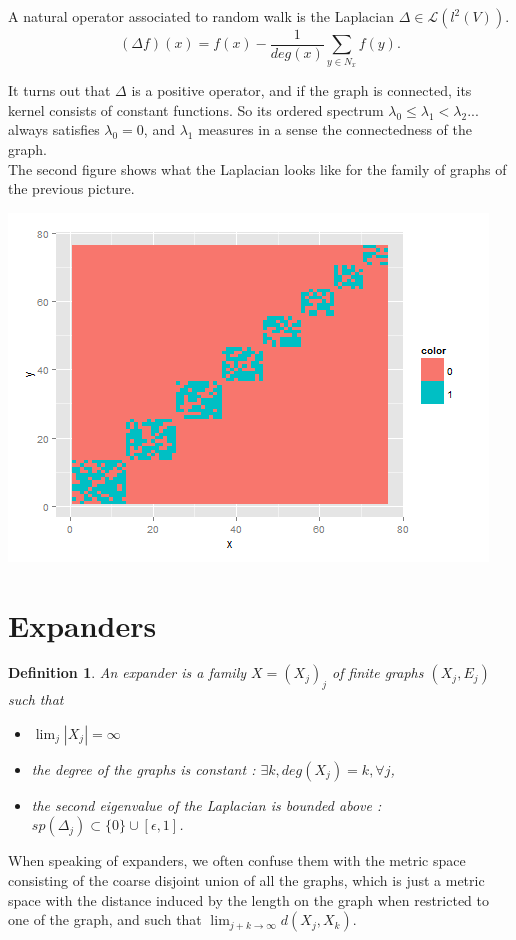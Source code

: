 \documentclass[a0,portrait]{a0poster}
\newtheorem{definition}{Definition}
\begin{document}
\begin{multicols}{2}
A natural operator associated to random walk is the Laplacian $\Delta \in \mathcal L(l^2(V))$.
\[(\Delta f) (x) = f(x) - \frac{1}{deg(x)}\sum_{y\in N_x} f(y) .\] 

It turns out that $\Delta$ is a positive operator, and if the graph is connected, its kernel consists of constant functions. So its ordered spectrum $\lambda_0\leq \lambda_1<\lambda_2...$ always satisfies $\lambda_0=0$, and $\lambda_1$ measures in a sense the connectedness of the graph.\\

The second figure shows what the Laplacian looks like for the family of graphs of the previous picture.\\

\begin{center}\vspace{1cm}
\includegraphics[width=0.9\linewidth]{Laplacian}
\end{center}\vspace{1cm}

\section*{Expanders}

\begin{definition}
An expander is a family $X=(X_j)_j$ of finite graphs $(X_j,E_j)$ such that 
\begin{itemize}
\item[$\bullet$] $\lim_{j}|X_j|=\infty$
\item[$\bullet$] the degree of the graphs is constant : $\exists k, deg(X_j)=k,\forall j$,
\item[$\bullet$] the second eigenvalue of the Laplacian is bounded above : $sp(\Delta_j)\subset \{0\}\cup [\epsilon,1]$.
\end{itemize}
\end{definition}
When speaking of expanders, we often confuse them with the metric space consisting of the coarse disjoint union of all the graphs, which is just a metric space with the distance induced by the length on the graph when restricted to one of the graph, and such that $\lim_{j+k\rightarrow \infty}d(X_j,X_k)$.\\


\end{multicols}
\end{document}
